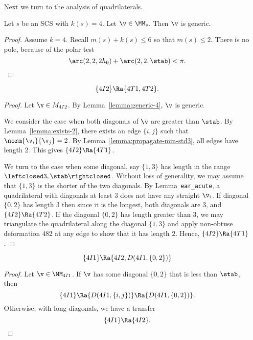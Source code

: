 
Next we turn to the analysis of quadrilaterals.

\begin{lemma}[]\label{lemma:generic-4}
Let $s$ be an SCS with $k(s)= 4$.
Let $\v\in \MM_s$.  Then $\v$ is generic.
\end{lemma}

\begin{proof}
Assume $k=4$.
Recall $m(s) + k(s) \le 6$ so that $m(s)\le 2$.
There is no pole, because of the polar test
\[
\arc(2,2,2h_0) + \arc(2,2,\stab) < \pi.
\]
\end{proof}


\begin{lemma}[]
\[
\{4I2\}\Ra \{4T1,4T2\}.
\]
\end{lemma}

\begin{proof}
Let $\v\in M_{4I2}$. By Lemma~\ref{lemma:generic-4}, $\v$ is generic.

We consider the case when both diagonals of $\v$ are greater than $\stab$.
By Lemma~\ref{lemma:exists-2}, there exists an edge $\{i,j\}$ such that $\norm{\v_i}{\v_j}=2$.
By Lemma~\ref{lemma:propagate-min-std3}, all edges have length $2$.  This gives $\{4I2\}\Ra\{4T1\}$.

We turn to the case when some diagonal, say $\{1,3\}$ has length in the range $\leftclosed 3,\stab\rightclosed$.
Without loss of generality, we may assume that $\{1,3\}$ is the shorter of the two diagonals.
By Lemma~{\tt ear\_acute}, a quadrilateral with diagonals at least $3$ does not have any straight $\v_i$.
If diagonal $\{0,2\}$ has length $3$ then since it is the longest, both diagonals are $3$, and $\{4I2\}\Ra\{4T2\}$.
If the diagonal $\{0,2\}$ has length greater than $3$, we may triangulate the quadrilateral along the diagonal
$\{1,3\}$ and apply non-obtuse deformation 482 at any edge to show that it has length $2$.  Hence,
$\{4I2\}\Ra\{4T1\}$.
\end{proof}

\begin{lemma}[]
\[
\{4I1\}\Ra \{4I2,D(4I1,\{0,2\})\}
\]
\end{lemma}

\begin{proof}  Let $\v\in \MM_{4I1}$.  If $\v$ has some diagonal $\{0,2\}$ that is less than $\stab$,
then
\[
\{4I1\}\Ra\{D(4I1,\{i,j\})\}\Ra\{D(4I1,\{0,2\})\}.
\]
Otherwise, with long diagonals, we have a transfer
\[
\{4I1\}\Ra \{4I2\}.
\]
\end{proof}

